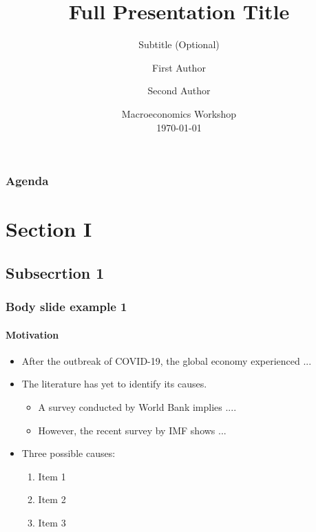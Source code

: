 \documentclass[
	11pt, %
]{beamer}
\title[Short Title]{Full Presentation Title}
\subtitle{Subtitle (Optional)}
\author[Author1 \and Author2]{First Author \and Second Author}
\institute[WUSTL]{Washington University in St. Louis \\ \smallskip \textit{corresponding.author@wustl.edu}}
\date[\today]{Macroeconomics Workshop \\ \today}
\begin{document}
\begin{frame}
	\titlepage %
\end{frame}

\begin{frame}
	\frametitle{Agenda} %
	
	\tableofcontents %
\end{frame}

\section{Section I} %

\subsection{Subsecrtion 1} %

\begin{frame}
	\frametitle{Body slide example 1} %
	\framesubtitle{Motivation}  %
	
	\begin{itemize}
		\item After the outbreak of COVID-19, the global economy experienced ...
		\item The literature has yet to identify its causes.
		\begin{itemize}
			\item A survey conducted by World Bank implies ....
			\item However, the recent survey by IMF shows ...
		\end{itemize}
		\item Three possible causes:
		\begin{enumerate}
			\item Item 1
			\item Item 2
			\item Item 3 
		\end{enumerate}
	\end{itemize}
\end{frame}
\end{document}
